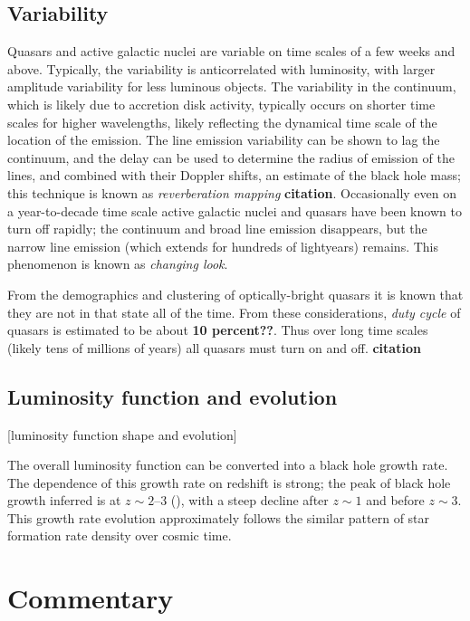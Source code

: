 \subsection{Variability}

Quasars and active galactic nuclei are variable on time scales of a
few weeks and above. Typically, the variability is anticorrelated with
luminosity, with larger amplitude variability for less luminous
objects. The variability in the continuum, which is likely due to
accretion disk activity, typically occurs on shorter time scales for
higher wavelengths, likely reflecting the dynamical time scale of the
location of the emission.  The line emission variability can be shown
to lag the continuum, and the delay can be used to determine the
radius of emission of the lines, and combined with their Doppler
shifts, an estimate of the black hole mass; this technique is known as
{\it reverberation mapping} {\bf citation}. Occasionally even on a
year-to-decade time scale active galactic nuclei and quasars have been
known to turn off rapidly; the continuum and broad line emission
disappears, but the narrow line emission (which extends for hundreds
of lightyears) remains. This phenomenon is known as {\it changing
look}.

From the demographics and clustering of optically-bright quasars it is
known that they are not in that state all of the time. From these
considerations, {\it duty cycle} of quasars is estimated to be about
{\bf 10 percent??}. Thus over long time scales (likely tens of
millions of years) all quasars must turn on and off. {\bf citation}

\subsection{Luminosity function and evolution}

[luminosity function shape and evolution]

The overall luminosity function can be converted into a black hole
growth rate. The dependence of this growth rate on redshift is
strong; the peak of black hole growth inferred is at $z\sim 2$--3
(\citealt{shankar09a}), with a steep decline after $z\sim 1$ and
before $z\sim 3$. This growth rate evolution approximately follows the
similar pattern of star formation rate density over cosmic time.

\section{Commentary}

